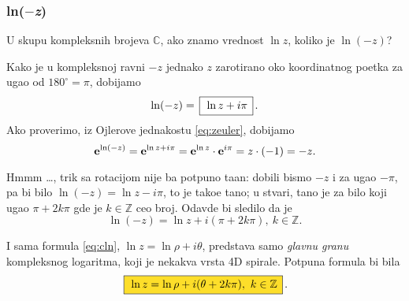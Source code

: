 \subsubsection{ln($-$\textit{z})}

\zadatak U skupu kompleksnih brojeva $\mathbb C$, ako znamo vrednost $\ln z$,
koliko je $\ln(-z)$?

\resenje Kako je u kompleksnoj ravni $-z$ jednako $z$ zarotirano 
oko koordi\-natnog po{\cv}etka
za ugao od $180^\circ=\pi$, dobijamo
$$
\ln (-z) = \ram{\ln z +i\pi}.
$$ 
Ako proverimo, iz Ojlerove jednakostu \eqref{eq:zeuler}, dobijamo
$$
{\bf e}^{\ln(-z)} = {\bf e}^{\ln z+i\pi} = {\bf e}^{\ln z}\cdot {\bf e}^{i\pi}=z \cdot (-1)=-z.
$$

\dodatak Hmmm \dots, trik sa rotacijom nije ba{\sv} potpuno ta{\cv}an: dobili bismo $-z$ i za ugao $-\pi$,
pa bi bilo $\ln(-z)=\ln z-i\pi$, {\sv}to je tako{\dj}e ta{\cv}no;
u stvari, ta{\cv}no je za bilo koji ugao $\pi+2k\pi$ gde je $k\in{\mathbb Z}$ ceo broj. Odavde bi sledilo da je
$$
\ln(-z) = \ln z + i(\pi+2k\pi),\ k\in{\mathbb Z}.
$$

I sama formula \eqref{eq:cln}, $\ln z=\ln\rho + i\theta$, predstav{\lj}a samo {\sl glavnu granu\/}
kompleksnog logaritma, koji je nekakva vrsta 4D spirale. Potpuna formula bi bila
\begin{equation}
    \okvir{\ln z=\ln\rho + i(\theta + 2k\pi),\ k\in{\mathbb Z}} .
\end{equation}
